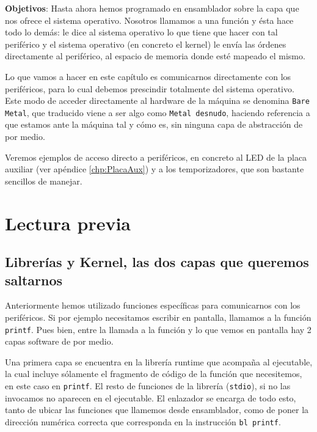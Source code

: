 %

\label{chp:Subrut}
\minitoc

{\bf Objetivos}: Hasta ahora hemos programado en ensamblador sobre
la capa que nos ofrece el sistema operativo. Nosotros llamamos a una
función y ésta hace todo lo demás: le dice al sistema operativo lo
que tiene que hacer con tal periférico y el sistema operativo (en concreto
el kernel) le envía las órdenes directamente al periférico, al espacio
de memoria donde esté mapeado el mismo.

Lo que vamos a hacer en este capítulo es comunicarnos directamente con los
periféricos, para lo cual debemos prescindir totalmente del sistema operativo.
Este modo de acceder directamente al hardware de la máquina se denomina {\tt Bare Metal},
que traducido viene a ser algo como {\tt Metal desnudo}, haciendo referencia a
que estamos ante la máquina tal y cómo es, sin ninguna capa de abstracción de
por medio.

Veremos ejemplos de acceso directo a periféricos, en concreto al LED de la placa
auxiliar (ver apéndice \ref{chp:PlacaAux}) y a los temporizadores, que son
bastante sencillos de manejar.

\section{Lectura previa}

\subsection{Librerías y Kernel, las dos capas que queremos saltarnos}

Anteriormente hemos utilizado funciones específicas para
comunicarnos con los periféricos. Si por ejemplo necesitamos escribir
en pantalla, llamamos a la función {\tt printf}. Pues bien, entre
la llamada a la función y lo que vemos en pantalla hay 2 capas software
de por medio.

Una primera capa se encuentra en la librería runtime que acompaña al
ejecutable, la cual incluye sólamente el fragmento de código de la
función que necesitemos, en este caso en {\tt printf}. El resto de
funciones de la librería ({\tt stdio}), si no las invocamos no aparecen
en el ejecutable. El enlazador se encarga de todo esto, tanto de ubicar
las funciones que llamemos desde ensamblador, como de poner la dirección
numérica correcta que corresponda en la instrucción {\tt bl printf}.

